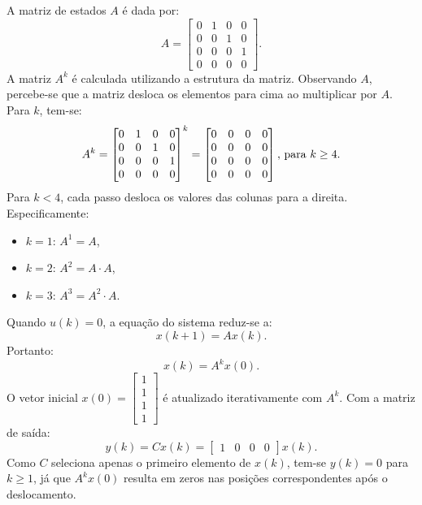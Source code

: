 \begin{resolution}
  A matriz de estados \( A \) é dada por:
  \[
    A =
    \begin{bmatrix}
      0 & 1 & 0 & 0 \\
      0 & 0 & 1 & 0 \\
      0 & 0 & 0 & 1 \\
      0 & 0 & 0 & 0
    \end{bmatrix}.
  \]
  A matriz \( A^k \) é calculada utilizando a estrutura da matriz. Observando \( A \), percebe-se que a matriz desloca os elementos para cima ao multiplicar por \( A \). Para \( k \), tem-se:
  \[
    A^k =
    \begin{bmatrix}
      0 & 1 & 0 & 0 \\
      0 & 0 & 1 & 0 \\
      0 & 0 & 0 & 1 \\
      0 & 0 & 0 & 0
    \end{bmatrix}^k =
    \begin{bmatrix}
      0 & 0 & 0 & 0 \\
      0 & 0 & 0 & 0 \\
      0 & 0 & 0 & 0 \\
      0 & 0 & 0 & 0
    \end{bmatrix}, \, \text{para \( k \geq 4 \)}.
  \]
  Para \( k < 4 \), cada passo desloca os valores das colunas para a direita. Especificamente:
  \begin{itemize}
    \item \( k = 1 \): \( A^1 = A \),
    \item \( k = 2 \): \( A^2 = A \cdot A \),
    \item \( k = 3 \): \( A^3 = A^2 \cdot A \).
  \end{itemize}

  Quando \( u(k) = 0 \), a equação do sistema reduz-se a:
  \[
    x(k+1) = A x(k).
  \]
  Portanto:
  \[
    x(k) = A^k x(0).
  \]
  O vetor inicial \( x(0) = \begin{bmatrix} 1 \\ 1 \\ 1 \\ 1 \end{bmatrix} \) é atualizado iterativamente com \( A^k \). Com a matriz de saída:
  \[
    y(k) = C x(k) = \begin{bmatrix} 1 & 0 & 0 & 0 \end{bmatrix} x(k).
  \]
  Como \( C \) seleciona apenas o primeiro elemento de \( x(k) \), tem-se \( y(k) = 0 \) para \( k \geq 1 \), já que \( A^k x(0) \) resulta em zeros nas posições correspondentes após o deslocamento.


\end{resolution}
